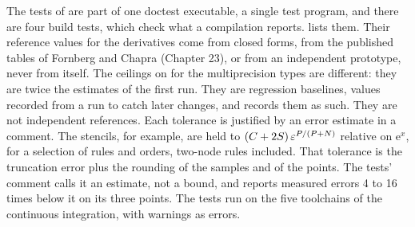 The tests of  are part of one doctest executable, a single test program, and there are four build
tests, which check what a compilation reports.  lists them. Their reference values for the derivatives come from closed forms,
from the published tables of Fornberg\cite{fornberg1988} and Chapra (Chapter 23),\cite{chapra2015} or from an
independent prototype, never from \nxx{} itself. The ceilings on  for the multiprecision types are
different: they are twice the estimates of the first run. They are regression baselines, values recorded from a
run to catch later changes, and  records them as such. They are not independent
references. Each tolerance is justified by an error estimate in a comment. The stencils, for example, are held to
$(C + 2S)\,\varepsilon^{P/(P+N)}$ relative on $\mathrm{e}^x$, for a selection of rules and orders, two-node
rules included. That tolerance is the truncation error plus the rounding of the samples and of the points. The tests'
comment calls it an estimate, not a bound, and reports measured errors 4 to 16 times below it on its three points.
The tests run on the five toolchains of the continuous integration, with warnings as errors.

